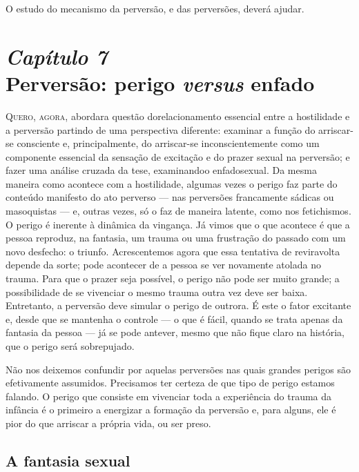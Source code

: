 O estudo do mecanismo da perversão, e das perversões, deverá ajudar.


\chapter[\textbf{7}\quad Perversão: perigo \textit{versus} enfado]{{\large\textit{Capítulo 7}}\\ Perversão: perigo \textit{versus} enfado}

\textsc{Quero, agora,} abordar\idxperigo[|(] a questão do\idxpervexpos[|(] relacionamento essencial entre a
hostilidade e a perversão partindo de uma perspectiva diferente:
examinar a função do arriscar-se consciente e,\idxperigocon{} principalmente, do
arriscar-se inconscientemente como um componente essencial da sensação
de excitação e do prazer sexual na perversão; e fazer uma análise
cruzada da tese, examinando\idxpervenfad[|(] o enfado\idxenfa[|(] sexual. Da mesma maneira como
acontece com a hostilidade, algumas vezes o perigo faz parte do
conteúdo manifesto do ato perverso --- nas perversões francamente
sádicas ou masoquistas --- e, outras vezes, só o faz de maneira
latente, como nos fetichismos.\idxfetic{} O perigo é inerente à dinâmica da
vingança.\idxvinga{} Já vimos que o que acontece é que a pessoa reproduz, na
fantasia, um trauma ou uma frustração do passado com um novo desfecho:
o triunfo. Acrescentemos agora que essa tentativa de reviravolta
depende da sorte; pode acontecer de a pessoa se ver novamente atolada
no trauma. Para que o prazer seja possível, o perigo não pode ser muito
grande; a possibilidade de se vivenciar o mesmo trauma outra vez deve
ser baixa. Entretanto, a perversão deve simular o perigo de outrora. É
este o fator excitante e, desde que se mantenha o controle --- o que é
fácil, quando se trata apenas da fantasia da pessoa --- já se pode
antever, mesmo que não fique claro na história, que o perigo será
sobrepujado.

Não nos deixemos confundir por aquelas perversões nas quais grandes
perigos são efetivamente assumidos. Precisamos ter certeza de que tipo
de perigo estamos falando. O perigo que consiste em vivenciar toda a
experiência do trauma da infância é o primeiro a energizar a formação
da perversão e, para alguns, ele é pior do que arriscar a própria vida,
ou ser preso.


\section{A fantasia sexual}

